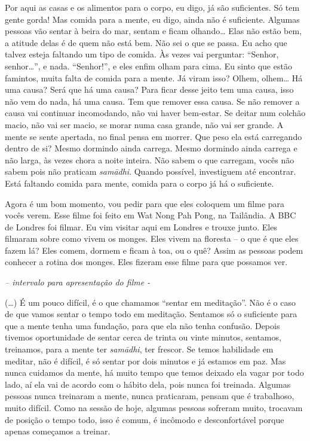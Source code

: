 Por aqui as casas e os alimentos para o corpo, eu digo, já são
suficientes. Só tem gente gorda! Mas comida para a mente, eu digo,
ainda não é suficiente. Algumas pessoas vão sentar à beira do mar,
sentam e ficam olhando… Elas não estão bem, a atitude delas é de quem
não está bem. Não sei o que se passa. Eu acho que talvez esteja
faltando um tipo de comida. Às vezes vai perguntar: “Senhor, senhor…”,
e nada. “Senhor!”, e eles enfim olham para cima. Eu sinto que estão
famintos, muita falta de comida para a mente. Já viram isso? Olhem,
olhem… Há uma causa? Será que há uma causa? Para ficar desse jeito tem
uma causa, isso não vem do nada, há uma causa. Tem que remover essa
causa. Se não remover a causa vai continuar incomodando, não vai haver
bem-estar. Se deitar num colchão macio, não vai ser macio, se morar
numa casa grande, não vai ser grande. A mente se sente apertada, no
final pensa em morrer. Que peso ela está carregando dentro de si? Mesmo
dormindo ainda carrega. Mesmo dormindo ainda carrega e não larga, às
vezes chora a noite inteira. Não sabem o que carregam, vocês não sabem
pois não praticam \textit{samādhi}. Quando possível, investiguem até
encontrar. Está faltando comida para mente, comida para o corpo já há o
suficiente.

Agora é um bom momento, vou pedir para que eles coloquem um filme
para vocês verem. Esse filme foi feito em Wat Nong Pah Pong, na
Tailândia. A BBC de Londres foi filmar. Eu vim visitar aqui em Londres
e trouxe junto. Eles filmaram sobre como vivem os monges. Eles vivem na
floresta – o que é que eles fazem lá? Eles comem, dormem e ficam à toa,
ou o quê? Assim as pessoas podem conhecer a rotina dos monges. Eles
fizeram esse filme para que possamos ver. 

{\itshape
-- intervalo para apresentação do filme -}

(…) É um pouco difícil, é o que chamamos “sentar em meditação”. Não
é o caso de que vamos sentar o tempo todo em meditação. Sentamos só o
suficiente para que a mente tenha uma fundação, para que ela não tenha
confusão. Depois tivemos oportunidade de sentar cerca de trinta ou
vinte minutos, sentamos, treinamos, para a mente ter
\textit{samādhi}, ter frescor. Se temos habilidade em meditar, não é
difícil, é só sentar por dois minutos e já estamos em paz. Mas nunca
cuidamos da mente, há muito tempo que temos deixado ela vagar por todo
lado, aí ela vai de acordo com o hábito dela, pois nunca foi treinada.
Algumas pessoas nunca treinaram a mente, nunca praticaram, pensam que é
trabalhoso, muito difícil. Como na sessão de hoje, algumas pessoas
sofreram muito, trocavam de posição o tempo todo, isso é comum, é
incômodo e desconfortável porque apenas começamos a treinar.

